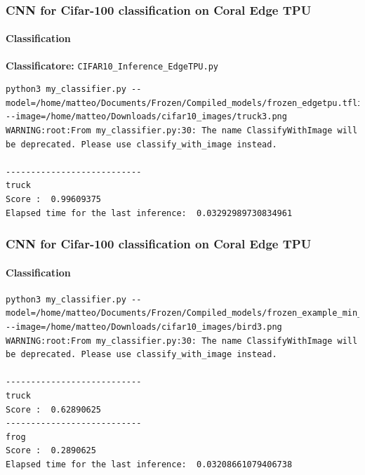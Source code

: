 \documentclass{beamer}
\begin{document}
\begin{frame}[fragile]
\frametitle{CNN for Cifar-100 classification on Coral Edge TPU}
\framesubtitle{Classification}
\textbf{Classificatore:} \verb+CIFAR10_Inference_EdgeTPU.py+
\begin{lstlisting}
python3 my_classifier.py --model=/home/matteo/Documents/Frozen/Compiled_models/frozen_edgetpu.tflite --image=/home/matteo/Downloads/cifar10_images/truck3.png 
WARNING:root:From my_classifier.py:30: The name ClassifyWithImage will be deprecated. Please use classify_with_image instead.

---------------------------
truck
Score :  0.99609375
Elapsed time for the last inference:  0.03292989730834961
\end{lstlisting}
\end{frame}

\begin{frame}[fragile]
\frametitle{CNN for Cifar-100 classification on Coral Edge TPU}
\framesubtitle{Classification}
\begin{lstlisting}
python3 my_classifier.py --model=/home/matteo/Documents/Frozen/Compiled_models/frozen_example_min_max_edgetpu.tflite --image=/home/matteo/Downloads/cifar10_images/bird3.png 
WARNING:root:From my_classifier.py:30: The name ClassifyWithImage will be deprecated. Please use classify_with_image instead.

---------------------------
truck
Score :  0.62890625
---------------------------
frog
Score :  0.2890625
Elapsed time for the last inference:  0.03208661079406738
\end{lstlisting}
\end{frame}
\end{document}
